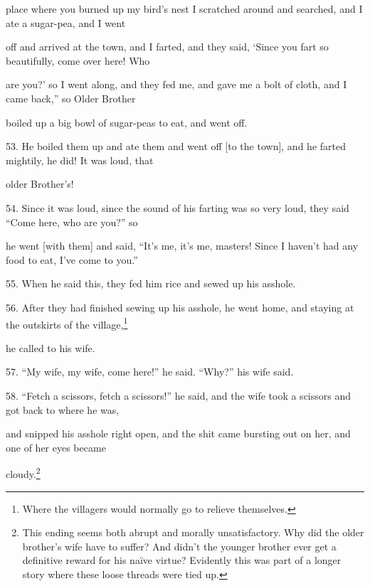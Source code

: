 place where you burned up my bird's nest I scratched around and searched, and I
ate a sugar-pea, and I went

off and arrived at the town, and I farted, and they said, `Since you fart so beautifully,
come over here! Who

are you?' so I went along, and they fed me, and gave me a bolt of cloth, and I
came back,'' so Older Brother

boiled up a big bowl of sugar-peas to eat, and went off.

53. He boiled them up and ate them and went off [to the town], and he farted mightily,
he did! It was loud, that

older Brother's!

54. Since it was loud, since the sound of his farting was so very loud, they said
``Come here, who are you?'' so

he went [with them] and said, ``It's me, it's me, masters! Since I haven't had
any food to eat, I've come to you.''

55. When he said this, they fed him rice and sewed up his asshole.

56. After they had finished sewing up his asshole, he went home, and staying at
the outskirts of the village,\footnote{Where the villagers would normally go to relieve themselves.}

he called to his wife.

57. ``My wife, my wife, come here!'' he said. ``Why?'' his wife said.

58. ``Fetch a scissors, fetch a scissors!'' he said, and the wife took a scissors
and got back to where he was,

and snipped his asshole right open, and the shit came bursting out on her, and
one of her eyes became

cloudy.\footnote{This ending seems both abrupt and morally unsatisfactory. Why did the older brother's wife have to suffer? And didn't the younger brother ever get a definitive reward for his naïve virtue? Evidently this was part of a longer story where these loose threads were tied up.}

